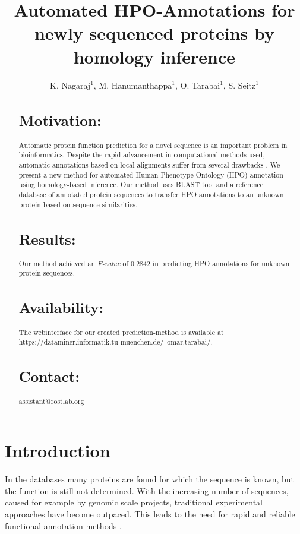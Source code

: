 \documentclass{bioinfo}
\begin{document}

\title{Automated HPO-Annotations for newly sequenced proteins by homology inference}
\author{K. Nagaraj$^{1}$, M. Hanumanthappa$^{1}$, O. Tarabai$^{1}$, S. Seitz$^{1}$}
\address{$^{1}$Fakul\"at f\"ur Informatik, Boltzmannstr. 3, 85748 Garching}



\maketitle

\begin{abstract}

\section{Motivation:}
Automatic protein function prediction for a novel sequence is an important problem in bioinformatics. Despite the rapid advancement in computational methods used, automatic annotations based on local alignments suffer from several drawbacks \citep{Ori06}. We present a new method for automated Human Phenotype Ontology (HPO) annotation using homology-based inference. Our method uses BLAST tool and a reference database of annotated protein sequences to transfer HPO annotations to an unknown protein based on sequence similarities.
\section{Results:}
Our method achieved an \textit{F-value} of 0.2842 in predicting HPO annotations for unknown protein sequences.
\section{Availability:}
The webinterface for our created prediction-method is available at https://dataminer.informatik.tu-muenchen.de/~omar.tarabai/.

\section{Contact:} \href{assistant@rostlab.org}{assistant@rostlab.org}
\end{abstract}

\section{Introduction}
In the databases many proteins are found for which the sequence is known, but the function is still not determined. With the increasing number of sequences, caused for example by genomic scale projects, traditional experimental approaches have become outpaced. This leads to the need for rapid and reliable functional annotation methods \citep{Rodrigues07}. 
\end{document}
